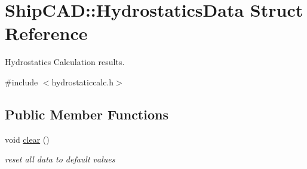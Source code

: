 \hypertarget{structShipCAD_1_1HydrostaticsData}{}\section{Ship\+C\+AD\+:\+:Hydrostatics\+Data Struct Reference}
\label{structShipCAD_1_1HydrostaticsData}


Hydrostatics Calculation results.  




{\ttfamily \#include $<$hydrostaticcalc.\+h$>$}

\subsection*{Public Member Functions}
\begin{DoxyCompactItemize}
\item 
void \hyperlink{structShipCAD_1_1HydrostaticsData_a7ea81ac589a3b24424b4176c734c7a37}{clear} ()
\begin{DoxyCompactList}\small\item\em reset all data to default values \end{DoxyCompactList}\end{DoxyCompactItemize}
